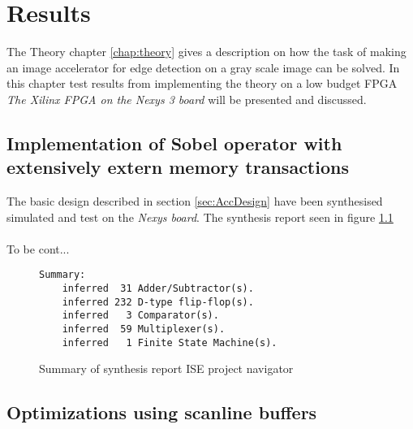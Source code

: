 \chapter{Results}
\label{chap:Results}
The Theory chapter \ref{chap:theory} gives a description on how the task of making an image accelerator for edge detection on a gray scale image can be solved. In this chapter test results from implementing the theory on a low budget FPGA \textit{The Xilinx FPGA on the Nexys 3 board} will be presented and discussed.  

\section{Implementation of Sobel operator with extensively extern memory transactions}
The basic design described in section \ref{sec:AccDesign} have been synthesised simulated and test on the \textit{Nexys board}. The synthesis report seen in figure \ref{fig:sum_synthesis_report}\\
\\
To be cont...  

\begin{figure}[H]
\centering
\begin{BVerbatim}
Summary:
    inferred  31 Adder/Subtractor(s).
    inferred 232 D-type flip-flop(s).
    inferred   3 Comparator(s).
    inferred  59 Multiplexer(s).
    inferred   1 Finite State Machine(s).
\end{BVerbatim}
\caption{Summary of synthesis report ISE project navigator}
\label{fig:sum_synthesis_report}
\end{figure}

\section{Optimizations using scanline buffers}
